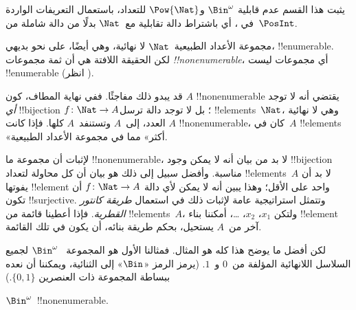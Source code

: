 \documentclass[../../../include/open-logic-section]{subfiles}
\begin{document}


\begin{editorial}
  يثبت هذا القسم عدم قابلية $\Bin^\omega$ و$\Pow{\Nat}$ للتعداد،
  باستعمال التعريفات الواردة في ، أي باشتراط
  دالة تقابلية مع~$\Nat$ بدلًا من دالة شاملة من~$\PosInt$.
\end{editorial}

\begin{explain}
مجموعة الأعداد الطبيعية~$\Nat$ لا نهائية، وهي أيضًا، على نحو بديهي،
!!{enumerable}. لكن الحقيقة اللافتة هي أن ثمة مجموعات
\emph{!!{nonenumerable}}، أي مجموعات ليست !!{enumerable}
(انظر ).

قد يبدو ذلك مفاجئًا. ففي نهاية المطاف، كون $A$
!!{nonenumerable} يقتضي أنه لا توجد \emph{أي} !!{bijection} $f
\colon \Nat \to A$؛ بل لا توجد دالة ترسل !!{element}s~$\Nat$،
وهي لا نهائية العدد، إلى~$A$ وتستنفد~$A$ كلها. فإذا كانت $A$
!!{nonenumerable}، كان في~$A$ !!{element}s «أكثر» مما في مجموعة
الأعداد الطبيعية.

لإثبات أن مجموعة ما !!{nonenumerable}، لا بد من بيان أنه لا يمكن
وجود !!{bijection} مناسبة. وأفضل سبيل إلى ذلك هو بيان أن كل محاولة
لتعداد !!{element}s~$A$ لا بد أن يفوتها !!{element} واحد على الأقل؛
وهذا يبين أنه لا يمكن لأي دالة $f\colon \Nat \to A$ أن تكون
!!{surjective}. وتتمثل استراتيجية عامة لإثبات ذلك في استعمال
\emph{طريقة كانتور القطرية}. فإذا أعطينا قائمة من !!{element}s~$A$،
ولتكن $x_1$، $x_2$، \dots، أمكننا بناء !!{element} آخر من~$A$ يستحيل،
بحكم طريقة بنائه، أن يكون في تلك القائمة.

لكن أفضل ما يوضح هذا كله هو المثال. فمثالنا الأول هو المجموعة
~$\Bin^\omega$ لجميع السلاسل اللانهائية المؤلفة من~$0$ و~$1$.
(يرمز الرمز «$\Bin$» إلى الثنائية، ويمكننا أن نعده ببساطة المجموعة
ذات العنصرين
$\{0,1\}$.)
\end{explain}

\begin{thm}
$\Bin^\omega$~!!{nonenumerable}.
\end{thm}
\end{document}
